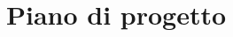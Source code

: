 \documentclass[12pt]{article}
\title{Piano di progetto}
\begin{document}
	\makefirstpage
	
	
	\clearpage
	
	\tableofcontents
	\clearpage
	
	
	
\end{document}
